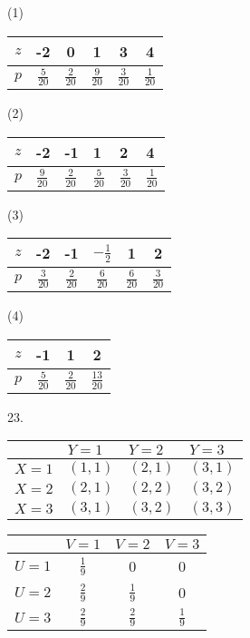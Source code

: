 \documentclass[14pt]{scrartcl} %
\numberwithin{equation}{section} %
\numberwithin{figure}{section} %
\numberwithin{table}{section} %
\begin{document}
	(1)
	
	\begin{tabular}{c|c|c|c|c|c}
		$z$ & -2 & 0 & 1 & 3 & 4 \\
		\hline
		$p$ & $\frac{5}{20}$ & $\frac{2}{20}$ & $\frac{9}{20}$ & $\frac{3}{20}$ & $\frac{1}{20}$ \\
		\hline
	\end{tabular}
	
	(2) \begin{tabular}{l|l|l|l|l|l}
		$z$ & -2 & -1 & 1 & 2 & 4 \\
		\hline
		$p$ & $\frac{9}{20}$ & $\frac{2}{20}$ & $\frac{5}{20}$ & $\frac{3}{20}$ & $\frac{1}{20}$ \\
		\hline
	\end{tabular}
	
	(3) \begin{tabular}{c|c|c|c|c|c}
		$z$ & -2 & -1 & $-\frac{1}{2}$ & 1 & 2 \\
		\hline
		$p$ & $\frac{3}{20}$ & $\frac{2}{20}$ & $\frac{6}{20}$ & $\frac{6}{20}$ & $\frac{3}{20}$ \\
		\hline
	\end{tabular}
	
	(4) \begin{tabular}{c|c|c|c}
		$z$ & -1 & 1 & 2 \\
		\hline
		$p$ & $\frac{5}{20}$ & $\frac{2}{20}$ & $\frac{13}{20}$ \\
		\hline
	\end{tabular}
	
	
	23.
	
	\begin{center}
		\begin{tabular}{l|l|l|l}
			& $Y=1$ & $Y=2$ & $Y=3$ \\
			\hline
			$X=1$ & $(1,1)$ & $(2,1)$ & $(3,1)$ \\
			\hline
			$X=2$ & $(2,1)$ & $(2,2)$ & $(3,2)$ \\
			\hline
			$X=3$ & $(3,1)$ & $(3,2)$ & $(3,3)$ \\
			\hline
		\end{tabular}
	\end{center}
	
	\begin{center}
		\begin{tabular}{c|c|c|c}
			& $V=1$ & $V=2$ & $V=3$ \\
			\hline
			$U=1$ & $\frac{1}{9}$ & 0 & 0 \\
			\hline
			$U=2$ & $\frac{2}{9}$ & $\frac{1}{9}$ & 0 \\
			\hline
			$U=3$ & $\frac{2}{9}$ & $\frac{2}{9}$ & $\frac{1}{9}$ \\
			\hline
		\end{tabular}
	\end{center}
	
\end{document}
